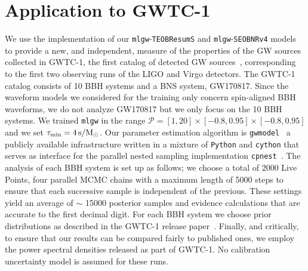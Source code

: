 \section{Application to GWTC-1}
\label{sec:GWTC1}
We use the implementation of our \texttt{mlgw}-{\tt TEOBResumS} and \texttt{mlgw}-{\tt SEOBNRv4} models 
to provide a new, and independent, measure of the properties of the GW sources
collected in GWTC-1, the first catalog of detected GW sources~\cite{LIGOScientific:2018mvr},
corresponding to the first two observing runs of the LIGO and Virgo detectors.
The GWTC-1 catalog consists of 10 BBH systems and a BNS system, GW170817. 
Since the waveform models we considered for the training only concern spin-aligned
BBH waveforms, we do not analyze GW170817 but we only focus on the 10 BBH systems.
We trained \texttt{mlgw} in the range $\mathcal{P} = [1,20]\times[-0.8,0.95]\times[-0.8,0.95]$ 
and we set $\tau_{\rm min} = \SI{4}{s/M_\odot}$.
Our parameter estimation algorithm is \texttt{gwmodel}~\cite{gwmodel} a publicly available infrastructure 
written in a mixture of \texttt{Python} and \texttt{cython} that serves as interface for the parallel nested 
sampling implementation \texttt{cpnest}~\cite{cpnest}. 
The analysis of each BBH system is set up as follows; we choose a total of 2000 Live Points, 
four parallel MCMC chains with a maximum length of 5000 steps to ensure that each successive 
sample is independent of the previous. These settings yield an average of $\sim$ 15000 posterior samples and 
evidence calculations that are accurate to the first decimal digit. For each BBH system we choose 
prior distributions as described in the GWTC-1 release paper~\cite{LIGOScientific:2018mvr}. Finally, 
and critically, to ensure that our results can be compared fairly to published ones, 
we employ the power spectral densities released as part of GWTC-1. No calibration uncertainty model is assumed for these runs. 

